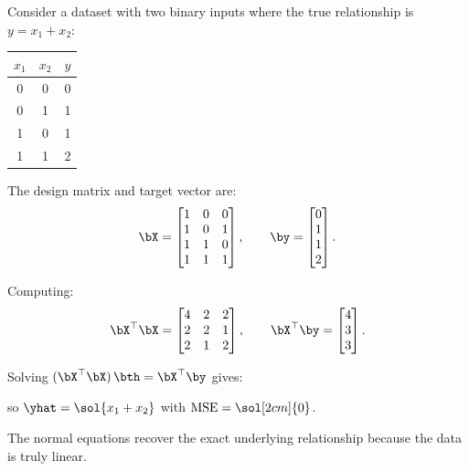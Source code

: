 \documentclass[12pt, a4paper]{article}
\begin{document}
\begin{example}
  Consider a dataset with two binary inputs where the true relationship is
  $y = x_1 + x_2$:

  \begin{center}
    \begin{tabular}{ccc}
      \toprule
      $x_1$ & $x_2$ & $y$ \\
      \midrule
      0     & 0     & 0   \\
      0     & 1     & 1   \\
      1     & 0     & 1   \\
      1     & 1     & 2   \\
      \bottomrule
    \end{tabular}
  \end{center}


  The design matrix and target vector are:
  \[
    \bX =
    \begin{bmatrix} 1 & 0 & 0 \\ 1 & 0 & 1 \\ 1 & 1 & 0 \\ 1 & 1 & 1 \end{bmatrix},
    \qquad
    \by =
    \begin{bmatrix} 0 \\ 1 \\ 1 \\ 2 \end{bmatrix}.
  \]

  Computing:
  \[
    \bX^{\top}\bX =
    \begin{bmatrix} 4 & 2 & 2 \\ 2 & 2 & 1 \\ 2 & 1 & 2 \end{bmatrix},
    \qquad
    \bX^{\top}\by =
    \begin{bmatrix} 4 \\ 3 \\ 3 \end{bmatrix}.
  \]

  Solving $(\bX^{\top}\bX)\,\bth = \bX^{\top}\by$ gives:


  so $\yhat = \sol{x_1 + x_2}$ with $\mathrm{MSE} = \sol[2cm]{0}$.

  The normal equations recover the exact underlying relationship because the
  data is truly linear.
\end{example}
\end{document}
